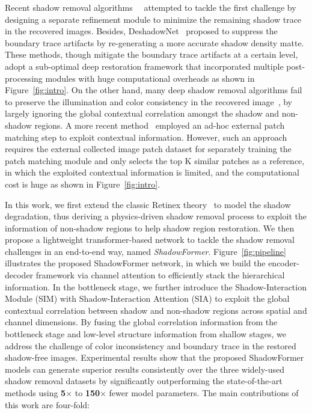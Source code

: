\documentclass[letterpaper]{article} \usepackage{aaai23}  \usepackage{times}  \usepackage{helvet}  \usepackage{courier}  \usepackage[hyphens]{url}  \usepackage{graphicx} \urlstyle{rm} \def\UrlFont{\rm}  \usepackage{natbib}  \usepackage{caption} \frenchspacing  \setlength{\pdfpagewidth}{8.5in} \setlength{\pdfpageheight}{11in} \usepackage{algorithm}
\begin{document}
Recent shadow removal algorithms~~\cite{le2019shadow,fu2021auto} attempted to tackle the first challenge by designing a separate refinement module to minimize the remaining shadow trace in the recovered images.
Besides, DeshadowNet~\cite{qu2017deshadownet} proposed to suppress the boundary trace artifacts by re-generating a more accurate shadow density matte.
These methods, though mitigate the boundary trace artifacts at a certain level, adopt a sub-optimal deep restoration framework that incorporated multiple post-processing modules with huge computational overheads as shown in Figure~\ref{fig:intro}. 
On the other hand, many deep shadow removal algorithms fail to preserve the illumination and color consistency in the recovered image~\cite{qu2017deshadownet,le2019shadow,fu2021auto}, by largely ignoring the global contextual correlation amongst the shadow and non-shadow regions.
A more recent method~\cite{chen2021canet} employed an ad-hoc external patch matching step to exploit contextual information. 
However, such an approach requires the external collected image patch dataset for separately training the patch matching module and only selects the top K similar patches as a reference, in which the exploited contextual information is limited, and the computational cost is huge as shown in Figure~\ref{fig:intro}. 


In this work, we first extend the classic Retinex theory~\cite{land1977retinex} to model the shadow degradation, thus deriving a physics-driven shadow removal process to exploit the information of non-shadow regions to help shadow region restoration.
We then propose a lightweight transformer-based network to tackle the shadow removal challenges in an end-to-end way, named \textit{ShadowFormer}. 
Figure~\ref{fig:pipeline} illustrates the proposed ShadowFormer network, in which we build the encoder-decoder framework via channel attention to efficiently stack the hierarchical information.
In the bottleneck stage, we further introduce the Shadow-Interaction Module (SIM) with Shadow-Interaction Attention (SIA) to 
exploit the global contextual correlation between shadow and non-shadow regions across spatial and channel dimensions.
By fusing the global correlation information from the bottleneck stage and low-level structure information from shallow stages, we address the challenge of color inconsistency and boundary trace in the restored shadow-free images.
Experimental results show that the proposed ShadowFormer models can generate superior results consistently over the three widely-used shadow removal datasets by significantly outperforming the state-of-the-art methods using \textbf{5$\times$} to \textbf{150$\times$} fewer model parameters.
The main contributions of this work are four-fold:
\end{document}
